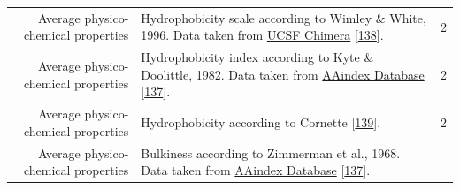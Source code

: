 \documentclass[12pt,a4paper,twoside]{book}
\theoremstyle{definition}
\theoremstyle{definition}
\theoremstyle{remark}
\begin{document}
\begin{longtable}[]{@{}rlc@{}}
\begin{minipage}[t]{0.23\columnwidth}\raggedleft\strut
Average physico-chemical properties\strut
\end{minipage} & \begin{minipage}[t]{0.50\columnwidth}\raggedright\strut
Hydrophobicity scale according to Wimley \& White, 1996. Data taken from
\href{https://www.cgl.ucsf.edu/chimera/docs/ContributedSoftware/defineattrib/wwHydrophobicity.txt}{UCSF
Chimera} {[}\protect\hyperlink{ref-Wimley1996}{138}{]}.\strut
\end{minipage} & \begin{minipage}[t]{0.18\columnwidth}\centering\strut
2\strut
\end{minipage}\tabularnewline
\begin{minipage}[t]{0.23\columnwidth}\raggedleft\strut
Average physico-chemical properties\strut
\end{minipage} & \begin{minipage}[t]{0.50\columnwidth}\raggedright\strut
Hydrophobicity index according to Kyte \& Doolittle, 1982. Data taken
from
\href{http://www.genome.jp/dbget-bin/www_bget?aaindex:KYTJ820101}{AAindex
Database} {[}\protect\hyperlink{ref-Kawashima2008}{137}{]}.\strut
\end{minipage} & \begin{minipage}[t]{0.18\columnwidth}\centering\strut
2\strut
\end{minipage}\tabularnewline
\begin{minipage}[t]{0.23\columnwidth}\raggedleft\strut
Average physico-chemical properties\strut
\end{minipage} & \begin{minipage}[t]{0.50\columnwidth}\raggedright\strut
Hydrophobicity according to Cornette
{[}\protect\hyperlink{ref-Cornette1987}{139}{]}.\strut
\end{minipage} & \begin{minipage}[t]{0.18\columnwidth}\centering\strut
2\strut
\end{minipage}\tabularnewline
\begin{minipage}[t]{0.23\columnwidth}\raggedleft\strut
Average physico-chemical properties\strut
\end{minipage} & \begin{minipage}[t]{0.50\columnwidth}\raggedright\strut
Bulkiness according to Zimmerman et al., 1968. Data taken from
\href{http://www.genome.jp/dbget-bin/www_bget?aaindex:ZIMJ680102}{AAindex
Database} {[}\protect\hyperlink{ref-Kawashima2008}{137}{]}.\strut
\end{minipage} & \begin{minipage}[t]{0.18\columnwidth}\centering\strut

\end{minipage}
\end{longtable}
\end{document}

